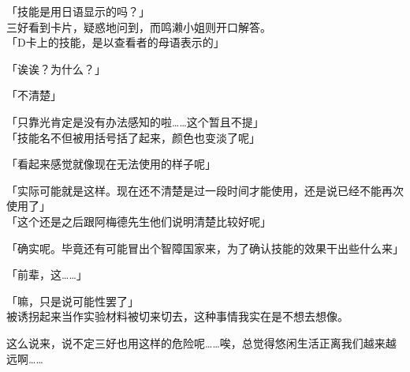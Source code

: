   \gray{[超回复]}

\cardline

「技能是用日语显示的吗？」\\

三好看到卡片，疑惑地问到，而鸣濑小姐则开口解答。\\

「D卡上的技能，是以查看者的母语表示的」

「诶诶？为什么？」

「不清楚」

「只靠光肯定是没有办法感知的啦……这个暂且不提」\\

「技能名不但被用括号括了起来，颜色也变淡了呢」

「看起来感觉就像现在无法使用的样子呢」

「实际可能就是这样。现在还不清楚是过一段时间才能使用，还是说已经不能再次使用了」\\

「这个还是之后跟阿梅德先生他们说明清楚比较好呢」

「确实呢。毕竟还有可能冒出个智障国家来，为了确认技能的效果干出些什么来」

「前辈，这……」

「嘛，只是说可能性罢了」\\

被诱拐起来当作实验材料被切来切去，这种事情我实在是不想去想像。

这么说来，说不定三好也用这样的危险呢……唉，总觉得悠闲生活正离我们越来越远啊……\\
